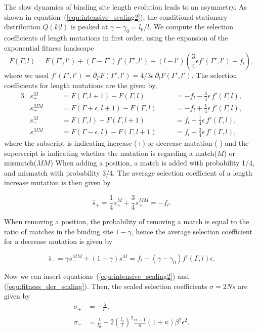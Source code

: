 \documentclass[10pt,a4paper]{article}
\begin{document}
\noindent The slow dynamics of binding site length evolution leads to an asymmetry. As shown in equation~(\ref{equ:intensive_scaling2}), the conditional stationary distribution $Q(k|l)$ is peaked at $\gamma-\gamma_0=l_0/l$. We compute the selection coefficients of length mutations in first order, using the expansion of the exponential fitness landscape
\begin{equation}
	F(\Gamma, l) = F(\Gamma', l') + (\Gamma-\Gamma') f'(\Gamma', l') + (l-l') \left(\frac{3}{4}\epsilon f'(\Gamma', l') - f_l\right),
\end{equation}
where we used $f'(\Gamma', l') = \partial_\Gamma F(\Gamma', l') = 4/3\epsilon \,\partial_l F(\Gamma', l')$.
The selection coefficients for length mutations are the given by,
\begin{alignat}{3}
	& s_+^M    \quad && = F(\Gamma, l+1) - F(\Gamma, l)          \quad && = -f_l - \frac{3}{4}\epsilon\,f'(\Gamma, l),\\
	& s_+^{MM} \quad && = F(\Gamma+\epsilon, l+1) - F(\Gamma, l) \quad && = -f_l + \frac{1}{4}\epsilon\,f'(\Gamma, l),\\
	& s_-^M    \quad && = F(\Gamma, l) - F(\Gamma, l+1)          \quad && = f_l + \frac{1}{4}\epsilon\,f'(\Gamma, l),\\
	& s_-^{MM} \quad && = F(\Gamma-\epsilon, l) - F(\Gamma, l+1) \quad && = f_l - \frac{3}{4}\epsilon\,f'(\Gamma, l),
\end{alignat}
where the subscript is indicating increase (+) or decrease mutation (-) and the superscript is indicating whether the mutation is regarding a match($M$) or mismatch($MM$)
When adding a position, a match is added with probability 1/4, and mismatch with probability 3/4. The average selection coefficient of a length increase mutation is then given by

\begin{equation}
	\bar s_+ = \frac{1}{4} s_+^M + \frac{3}{4} s_+^{MM} = -f_l.
\end{equation}

\noindent When removing a position, the probability of removing a match is equal to the ratio of matches in the binding site $1-\gamma$, hence the average selection coefficient for a decrease mutation is given by 

\begin{equation}
\bar s_- = \gamma s_-^{MM} + (1-\gamma) s_-^{M} = f_l - (\gamma - \gamma_0)f'(\Gamma, l)\epsilon.
\end{equation}

\noindent Now we can insert equations~(\ref{equ:intensive_scaling2}) and (\ref{equ:fitness_der_scaling}). Then, the scaled selection coefficients $\sigma = 2Ns$ are given by
\begin{align}
	\sigma_+ &= -\frac{\lambda}{l_0},\\
	\sigma_- &= \frac{\lambda}{l_0} - 2\left(\frac{l_0}{l}\right)^2\frac{n-1}{n}(1+\kappa)\beta^2\epsilon^2.
\end{align}
\end{document}
